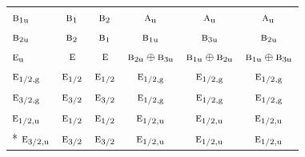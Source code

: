 \documentclass[10pt,a4paper]{article}
\numberwithin{equation}{section}
\newcommand{\irr}[1]{\text{\normalfont\scshape #1}}
\newcommand{\ptag}[1]{\mathrm{#1}}
\begin{document}
{\begin{longtable}{@{}lccccc@{}}
$\irr{b}_{1\ptag{u}}$ & $\irr{b}_{1}$ & $\irr{b}_{2}$ & $\irr{a}_{\ptag{u}}$ & $\irr{a}_{\ptag{u}}$ & $\irr{a}_{\ptag{u}}$\\
$\irr{b}_{2\ptag{u}}$ & $\irr{b}_{2}$ & $\irr{b}_{1}$ & $\irr{b}_{1\ptag{u}}$ & $\irr{b}_{3\ptag{u}}$ & $\irr{b}_{2\ptag{u}}$\\
$\irr{e}_{\ptag{u}}$ & $\irr{e}$ & $\irr{e}$ & $\irr{b}_{2\ptag{u}}\oplus \irr{b}_{3\ptag{u}}$ & $\irr{b}_{1\ptag{u}}\oplus \irr{b}_{2\ptag{u}}$ & $\irr{b}_{1\ptag{u}}\oplus \irr{b}_{3\ptag{u}}$\\
$\irr{e}_{1/2,\ptag{g}}$ & $\irr{e}_{1/2}$ & $\irr{e}_{1/2}$ & $\irr{e}_{1/2,\ptag{g}}$ & $\irr{e}_{1/2,\ptag{g}}$ & $\irr{e}_{1/2,\ptag{g}}$\\
$\irr{e}_{3/2,\ptag{g}}$ & $\irr{e}_{3/2}$ & $\irr{e}_{3/2}$ & $\irr{e}_{1/2,\ptag{g}}$ & $\irr{e}_{1/2,\ptag{g}}$ & $\irr{e}_{1/2,\ptag{g}}$\\
$\irr{e}_{1/2,\ptag{u}}$ & $\irr{e}_{1/2}$ & $\irr{e}_{1/2}$ & $\irr{e}_{1/2,\ptag{u}}$ & $\irr{e}_{1/2,\ptag{u}}$ & $\irr{e}_{1/2,\ptag{u}}$\\*
$\irr{e}_{3/2,\ptag{u}}$ & $\irr{e}_{3/2}$ & $\irr{e}_{3/2}$ & $\irr{e}_{1/2,\ptag{u}}$ & $\irr{e}_{1/2,\ptag{u}}$ & $\irr{e}_{1/2,\ptag{u}}$\\
\bottomrule\end{longtable}}
\end{document}
